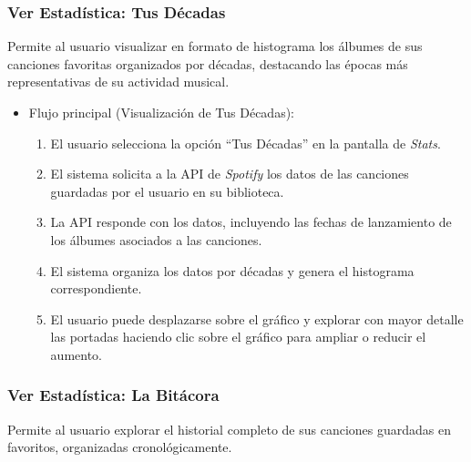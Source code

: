 \subsubsection*{Ver Estadística: Tus Décadas}

Permite al usuario visualizar en formato de histograma los álbumes de sus canciones favoritas organizados por décadas, destacando las épocas más representativas de su actividad musical.

\begin{itemize}
    \item Flujo principal (Visualización de Tus Décadas):
          \begin{enumerate}
              \item El usuario selecciona la opción ``Tus Décadas'' en la pantalla de \textit{Stats}.
              \item El sistema solicita a la API de \textit{Spotify} los datos de las canciones guardadas por el usuario en su biblioteca.
              \item La API responde con los datos, incluyendo las fechas de lanzamiento de los álbumes asociados a las canciones.
              \item El sistema organiza los datos por décadas y genera el histograma correspondiente.
              \item El usuario puede desplazarse sobre el gráfico y explorar con mayor detalle las portadas haciendo clic sobre el gráfico para ampliar o reducir el aumento.
          \end{enumerate}
\end{itemize}

\subsubsection*{Ver Estadística: La Bitácora}

Permite al usuario explorar el historial completo de sus canciones guardadas en favoritos, organizadas cronológicamente.

